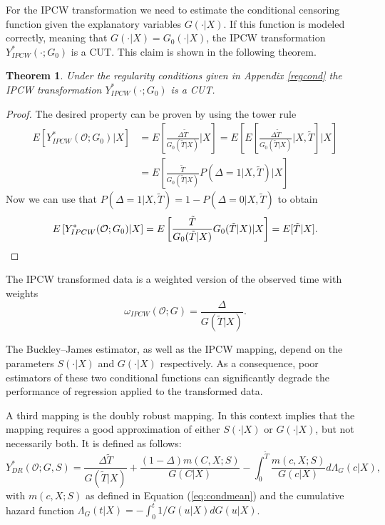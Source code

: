\documentclass[12pt, a4paper]{scrartcl}
\theoremstyle{definition}
\theoremstyle{plain}
\newtheorem{Theorem}{Theorem}[section]
\numberwithin{equation}{section}
\numberwithin{figure}{section}
\numberwithin{table}{section}
\begin{document}
	For the IPCW transformation we need to estimate the conditional censoring function given the explanatory variables $G(\cdot\vert X)$.
	If this function is modeled correctly, meaning that $G(\cdot\vert X)=G_0(\cdot\vert X)$, the IPCW transformation $Y_{IPCW}^*(\cdot; G_0)$ is a CUT.
	This claim is shown in the following theorem.
	\begin{Theorem}
		Under the regularity conditions given in Appendix \ref{regcond} the IPCW transformation $Y_{IPCW}^*(\cdot; G_0)$ is a CUT.
	\end{Theorem}
	\begin{proof}
		The desired property can be proven by using the tower rule
		\begin{equation*}
		\begin{split}
		E\left[Y_{IPCW}^*(\mathcal{O}; G_0)\vert X\right] &={} E\left[\frac{\Delta \tilde T}{G_0(\tilde T\vert X)}\vert X\right] = E\left[E\left[\frac{\Delta \tilde T}{G_0(\tilde T\vert X)}\vert X, \tilde T\right]\vert X\right]\\
		&={} E\left[\frac{\tilde T}{G_0(\tilde T \vert X)}P(\Delta = 1 \vert X, \tilde T)\vert X\right]
		\end{split}
		\end{equation*}
		Now we can use that $P(\Delta = 1\vert X, \tilde T) = 1-P(\Delta = 0\vert X, \tilde T)$ to obtain
		\begin{equation*}
		E\left[Y_{IPCW}^*(\mathcal{O}; G_0)\vert X\right] = E\left[\frac{\tilde T}{G_0(\tilde T \vert X)}G_0(\tilde T \vert X)\vert X\right] = E[\tilde T \vert X]. \qedhere
		\end{equation*}
	\end{proof}
		
	The IPCW transformed data is a weighted version of the observed time with weights
	\begin{equation}\label{eq:ipcw}
	\omega_{IPCW}(\mathcal{O}; G) = \frac{\Delta}{G(\tilde T \vert X)}.
	\end{equation}

	The Buckley--James estimator, as well as the IPCW mapping, depend on the parameters $S(\cdot\vert X)$ and $G(\cdot\vert X)$ respectively.
	As a consequence, poor estimators of these two conditional functions can significantly degrade the performance of regression applied to the transformed data.
	
	A third mapping is the doubly robust mapping.
	In this context  implies that the mapping requires a good approximation of either  $S(\cdot\vert X)$ or $G(\cdot\vert X)$, but not necessarily both.
	It is defined as follows:
	\begin{equation}\label{eq:drcut}
	Y_{DR}^* (\mathcal{O}; G, S) = \frac{\Delta \tilde T}{G(\tilde T\vert X)} + \frac{(1-\Delta)m(C,X;S)}{G(C \vert X)} - \int_{0}^{\tilde T} \frac{m(c,X;S)}{G(c \vert X)} d\Lambda_G(c \vert X),
	\end{equation}
	with $m(c,X;S)$ as defined in Equation (\ref{eq:condmean}) and the cumulative hazard function $\Lambda_G(t\vert X)=-\int_{0}^{t}1/G(u\vert X)dG(u\vert X)$.
	
\end{document}
